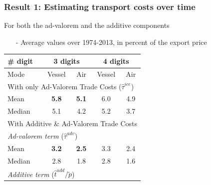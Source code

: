 \documentclass[10 pt,Helvetica, french]{beamer}
\begin{document}
\begin{frame}[label=slide_results_summary]
\frametitle{Result 1: Estimating transport costs over time}
For both the ad-valorem and the additive components \vspace{0.1cm}
\begin{itemize}
\item[-] \footnotesize{Average values over 1974-2013, in percent of the export price \hyperlink{app_results_summary}{}  } \vspace{0.1cm}
\end{itemize}
\begin{table}[htbp]
  \centering
  \scriptsize{
  \begin{center}
    \begin{tabular}{l|cc|cc}
      \hline \hline
    \# digit & \multicolumn{2}{c}{3 digits} & \multicolumn{2}{c}{4 digits} \\ \hline
    Mode  & Vessel & Air & Vessel & Air \\ \hline
    \multicolumn{5}{l}{With only Ad-Valorem Trade Costs ($\widehat{\tau}^{ice}$)}  \\ \hline
    Mean  & \bf{5.8} & \bf{5.1} & 6.0 & 4.9 \\
    Median & 5.1 & 4.2 & 5.2 & 3.7 \\ \hline
    \multicolumn{5}{l}{With Additive \& Ad-Valorem Trade Costs } \\ \hline
   \multicolumn{5}{l}{\textit{Ad-valorem term} ($\widehat{\tau}^{adv}$)}\\ \hline
    Mean  & \bf{3.2} & \bf{2.5} & 3.3 & 2.4 \\
    Median & 2.8 & 1.8 & 2.8 & 1.6 \\ \hline
    \multicolumn{5}{l}{\textit{Additive term }($\widehat{t}^{add}/\widetilde{p}$)} \\ \hline

\end{tabular}
\end{center}}
\end{table}
\end{frame}
\end{document}
